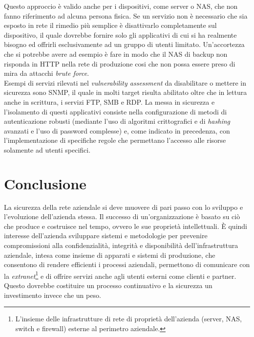 \documentclass[target=bach,aauheader=]{thud}
\begin{document}
Questo approccio è valido anche per i dispositivi, come server o NAS, che non fanno riferimento ad alcuna persona fisica. Se un servizio non è necessario che sia esposto in rete il rimedio più semplice è disattivarlo completamente sul dispositivo, il quale dovrebbe fornire solo gli applicativi di cui si ha realmente bisogno ed offrirli esclusivamente ad un gruppo di utenti limitato. Un'accortezza che si potrebbe avere ad esempio è fare in modo che il NAS di backup non risponda in HTTP nella rete di produzione cosi che non possa essere preso di mira da attacchi \textit{brute force}.
\\Esempi di servizi rilevati nel \textit{vulnerability assessment} da disabilitare o mettere in sicurezza sono SNMP, il quale in molti target risulta abilitato oltre che in lettura anche in scrittura, i servizi FTP, SMB e RDP. La messa in sicurezza e l'isolamento di questi applicativi consiste nella configurazione di metodi di autenticazione robusti (mediante l'uso di algoritmi crittografici e di \textit{hashing} avanzati e l'uso di password complesse) e, come indicato in precedenza, con l'implementazione di specifiche regole che permettano l'accesso alle risorse solamente ad utenti specifici.


\chapter{Conclusione}

La sicurezza della rete aziendale si deve muovere di pari passo con lo sviluppo e l'evoluzione dell'azienda stessa. Il successo di un'organizzazione è basato su ciò che produce e costruisce nel tempo, ovvero le sue proprietà intellettuali. È quindi interesse dell'azienda sviluppare sistemi e metodologie per prevenire compromissioni alla confidenzialità, integrità e disponibilità dell'infrastruttura aziendale, intesa come insieme di apparati e sistemi di produzione, che consentono di rendere efficienti i processi aziendali, permettono di comunicare con la \textit{extranet}\footnote{L'insieme delle infrastrutture di rete di proprietà dell'azienda (server, NAS, switch e firewall) esterne al perimetro aziendale.} e di offrire servizi anche agli utenti esterni come clienti e partner. Questo dovrebbe costituire un processo continuativo e la sicurezza un investimento invece che un peso.
\end{document}
